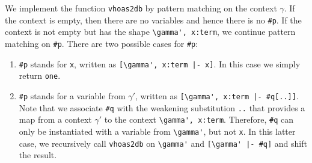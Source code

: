 We implement the function \lstinline!vhoas2db! by pattern matching on the context $\gamma$. If the context is empty, then there are no variables and hence there is no \lstinline!#p!. If the context is not empty but has the shape \lstinline!\gamma', x:term!, we continue pattern matching on \lstinline!#p!. There are two possible cases for \lstinline!#p!:
\begin{enumerate}
\item \lstinline!#p! stands for \lstinline!x!, written as \lstinline![\gamma', x:term |- x]!. In this case we simply return \lstinline!one!.
\item \lstinline!#p! stands for a variable from $\gamma'$, written as \lstinline![\gamma', x:term |- #q[..]]!. Note that we associate \lstinline!#q! with the weakening substitution \lstinline!..! that provides a map from a context $\gamma'$ to the context \lstinline!\gamma', x:term!. Therefore, \lstinline!#q! can only be instantiated with a variable from \lstinline!\gamma'!, but not \lstinline!x!. In this latter case, we recursively call \lstinline!vhoas2db! on \lstinline!\gamma'! and \lstinline![\gamma' |- #q]! and shift the result.
\end{enumerate}




